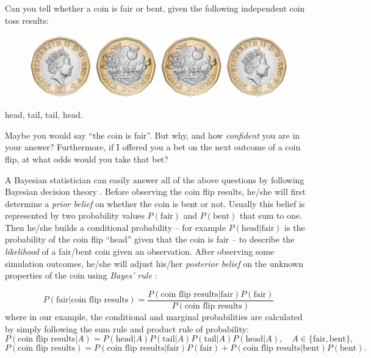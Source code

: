 
Can you tell whether a coin is fair or bent, given the following independent coin toss results:
\begin{figure}[h]
\centering
\includegraphics[width=0.4\linewidth]{Chapter1/coinflip.png}
\vspace{-1em}
\end{figure}
\begin{center}
head, tail, tail, head.
\end{center}

Maybe you would say ``the coin is fair''.  But why, and how \emph{confident} you are in your answer? Furthermore, if I offered you a bet on the next outcome of a coin flip, at what odds would you take that bet?

A Bayesian statistician can easily answer all of the above questions by following Bayesian decision theory \citep{bishop:prml2006, berger:decision2013}. Before observing the coin flip results, he/she will first determine a \emph{prior belief} on whether the coin is bent or not. Usually this belief is represented by two probability values $P(\text{fair})$ and $P(\text{bent})$ that sum to one. 
%
Then he/she builds a conditional probability -- for example $P( \text{head} | \text{fair} )$ is the probability of the coin flip ``head'' given that the coin is fair -- to describe the \emph{likelihood} of a fair/bent coin given an observation. 
%
After observing some simulation outcomes, he/she will adjust his/her \emph{posterior belief} on the unknown properties of the coin using \emph{Bayes' rule} \citep{bayes:bayes_rule1763, laplace:theorie1820}:

\begin{equation}
P(\text{fair} | \text{coin flip results} ) = \frac{P( \text{coin flip results} | \text{fair}) P(\text{fair})}{ P(\text{coin flip results})}
\label{eq:intro_bayes_rule}
\end{equation}
where in our example, the conditional and marginal probabilities are calculated by simply following the sum rule and product rule of probability:
$$ P( \text{coin flip results} | A) = P( \text{head} | A) P( \text{tail} | A) P( \text{tail} | A) P( \text{head} | A), \quad A \in \{ \text{fair}, \text{bent} \} ,$$
$$ P( \text{coin flip results}) = P( \text{coin flip results} | \text{fair}) P(\text{fair}) + P( \text{coin flip results} | \text{bent}) P(\text{bent}) .$$

